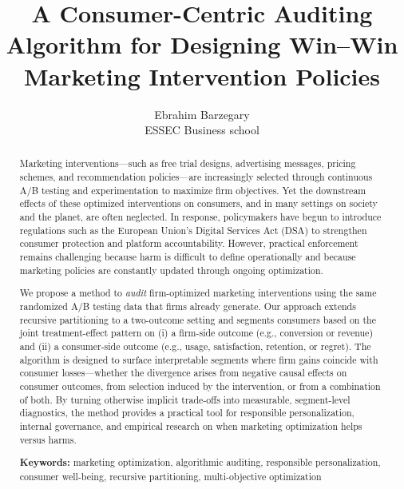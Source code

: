 \documentclass[11pt,letterpaper,english]{article}
\theoremstyle{definition}
\theoremstyle{definition}
\begin{document}
\title{A Consumer-Centric Auditing Algorithm for Designing Win–Win Marketing Intervention Policies}


\author{
       Ebrahim Barzegary \\ %
        ESSEC Business school\\
 }

\thispagestyle{empty}

\date{}
\maketitle

\begin{abstract} 

Marketing interventions—such as free trial designs, advertising messages, pricing schemes, and recommendation policies—are increasingly selected through continuous A/B testing and experimentation to maximize firm objectives. Yet the downstream effects of these optimized interventions on consumers, and in many settings on society and the planet, are often neglected. In response, policymakers have begun to introduce regulations such as the European Union’s Digital Services Act (DSA) to strengthen consumer protection and platform accountability. However, practical enforcement remains challenging because harm is difficult to define operationally and because marketing policies are constantly updated through ongoing optimization.

We propose a method to \emph{audit} firm-optimized marketing interventions using the same randomized A/B testing data that firms already generate. Our approach extends recursive partitioning to a two-outcome setting and segments consumers based on the joint treatment-effect pattern on (i) a firm-side outcome (e.g., conversion or revenue) and (ii) a consumer-side outcome (e.g., usage, satisfaction, retention, or regret). The algorithm is designed to surface interpretable segments where firm gains coincide with consumer losses—whether the divergence arises from negative causal effects on consumer outcomes, from selection induced by the intervention, or from a combination of both. By turning otherwise implicit trade-offs into measurable, segment-level diagnostics, the method provides a practical tool for responsible personalization, internal governance, and empirical research on when marketing optimization helps versus harms.



\vspace{5mm}

\noindent \textbf{Keywords:} marketing optimization, algorithmic auditing, responsible personalization, consumer well-being, recursive partitioning, multi-objective optimization 

\end{abstract}
\end{document}
